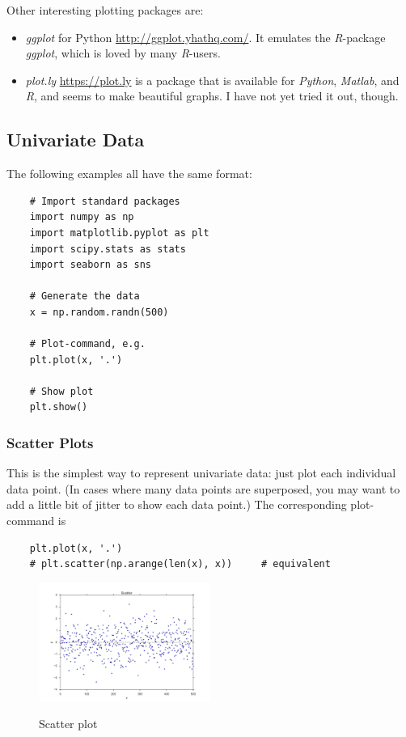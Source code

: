 Other interesting plotting packages are:

\begin{itemize}
  \item \emph{ggplot} for Python \url{http://ggplot.yhathq.com/}. It emulates the \emph{R}-package \emph{ggplot}, which is loved by many \emph{R}-users.
  \item \emph{plot.ly} \url{https://plot.ly} is a package that is available for \emph{Python}, \emph{Matlab}, and \emph{R}, and seems to make beautiful graphs. I have not yet tried it out, though.
\end{itemize}

\subsection{Univariate Data}

The following examples all have the same format:

\begin{lstlisting}
    # Import standard packages
    import numpy as np
    import matplotlib.pyplot as plt
    import scipy.stats as stats
    import seaborn as sns

    # Generate the data
    x = np.random.randn(500)

    # Plot-command, e.g.
    plt.plot(x, '.')

    # Show plot
    plt.show()
\end{lstlisting}


\subsubsection{Scatter Plots}

This is the simplest way to represent univariate data: just plot each individual data point. (In cases where many data points are superposed, you may want to add a little bit of jitter to show each data point.) The corresponding plot-command is

\begin{lstlisting}
    plt.plot(x, '.')
    # plt.scatter(np.arange(len(x), x))     # equivalent
\end{lstlisting}

\begin{figure}[H]
  \centering
  \includegraphics[width=0.5\textwidth]{../Images/scatterPlot.png}\\
  \caption{Scatter plot}
\end{figure}

